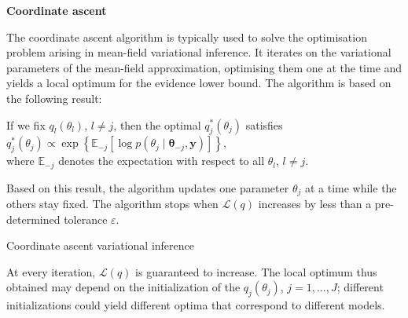 \documentclass[final]{beamer}
\begin{document}
\begin{multicols*}{3}
\vspace{1em}

\textbf{\large Coordinate ascent}

\vspace{1em}
The coordinate ascent algorithm is typically used to solve the optimisation problem arising in mean-field variational inference. It iterates on the variational parameters of the mean-field approximation, optimising them one at the time and yields a local optimum for the evidence lower bound. The algorithm is based on the following result:
\begin{lemma}

If we fix $q_l(\theta_l)$, $l\neq j$, then the optimal $q^*_j(\theta_j)$ satisfies\\
\vspace{1em}
$q^*_j(\theta_j) \propto \exp\left\lbrace\mathbb{E}_{-j}\left[\log p(\theta_j \mid \boldsymbol{\theta}_{-j}, \boldsymbol{y})\right]\right\rbrace,$\\
\vspace{1em}
where $\mathbb{E}_{-j}$ denotes the expectation with respect to all $\theta_l$, $l \neq j$.
\end{lemma}

Based on this result, the algorithm updates one parameter $\theta_j$ at a time while the others stay fixed. The algorithm stops when $\mathcal{L}(q)$ increases by less than a pre-determined tolerance $\varepsilon$.

\begin{algorithm}[H]
\BlankLine
{}
\BlankLine
{}
\BlankLine
{}
\caption{\label{alg:CAVI}Coordinate ascent variational inference}
\end{algorithm}
At every iteration, $\mathcal{L}(q)$ is guaranteed to increase. The local optimum thus obtained may depend on the initialization of the $q_j(\theta_j)$, $j=1,\ldots,J$; different initializations could yield different optima that correspond to different models.


\end{multicols*}
\end{document}
